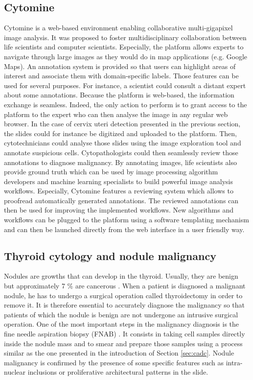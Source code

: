 \subsection{Cytomine} 
\label{sssec:detect_cytomine}
Cytomine \cite{maree2016collaborative} is a web-based environment enabling collaborative multi-gigapixel image analysis. It was proposed to foster multidisciplinary collaboration between life scientists and computer scientists. Especially, the platform allows experts to navigate through large images as they would do in map applications (e.g. Google Maps). An annotation system is provided so that users can highlight areas of interest and associate them with domain-specific labels. Those features can be used for several purposes. For instance, a scientist could consult a distant expert about some annotations. Because the platform is web-based, the information exchange is seamless. Indeed, the only action to perform is to grant access to the platform to the expert who can then analyse the image in any regular web browser. In the case of cervix uteri detection presented in the previous section, the slides could for instance be digitized and uploaded to the platform. Then, cytotechnicians could analyse those slides using the image exploration tool and annotate suspicious cells. Cytopathologists could then seamlessly review those annotations to diagnose malignancy. By annotating images, life scientists also provide ground truth which can be used by image processing algorithm developers and machine learning specialists to build powerful image analysis workflows. Especially, Cytomine features a reviewing system which allows to proofread automatically generated annotations. The reviewed annotations can then be used for improving the implemented workflows. New algorithms and workflows can be plugged to the platform using a software templating mechanism and can then be launched directly from the web interface in a user friendly way.  

\subsection{Thyroid cytology and nodule malignancy}
\label{ssec:intro_thyroid_case}
Nodules are growths that can develop in the thyroid. Usually, they are benign but approximately 7 \% are cancerous \cite{gopinath2013computer}. When a patient is diagnosed a malignant nodule, he has to undergo a surgical operation called thyroidectomy in order to remove it. It is therefore essential to accurately diagnose the malignancy so that patients of which the nodule is benign are not undergone an intrusive surgical operation. One of the most important steps in the malignancy diagnosis is the fine needle aspiration biopsy (FNAB) \cite{bomeli2010evaluation}. It consists in taking cell samples directly inside the nodule mass and to smear and prepare those samples using a process similar as the one presented in the introduction of Section \ref{sec:cadc}. Nodule malignancy is confirmed by the presence of some specific features such as intra-nuclear inclusions or proliferative architectural patterns in the slide. 

